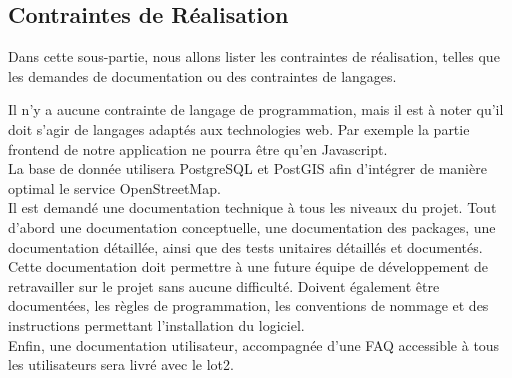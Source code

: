 \subsection{Contraintes de Réalisation}
Dans cette sous-partie, nous allons lister les contraintes de réalisation, telles que les demandes de documentation ou des contraintes de langages.

Il n'y a aucune contrainte de langage de programmation, mais il est à noter qu'il doit s'agir de langages adaptés aux technologies web. Par exemple la partie frontend de notre application ne pourra être qu'en Javascript.\\

La base de donnée utilisera PostgreSQL et PostGIS afin d'intégrer de manière optimal le service OpenStreetMap.\\

Il est demandé une documentation technique à tous les niveaux du projet. Tout d'abord une documentation conceptuelle, une documentation des packages, une documentation détaillée, ainsi que des tests unitaires détaillés et documentés. Cette documentation doit permettre à une future équipe de développement de retravailler sur le projet sans aucune difficulté. Doivent également être documentées, les règles de programmation, les conventions de nommage et des instructions permettant l'installation du logiciel.\\

Enfin, une documentation utilisateur, accompagnée d'une FAQ accessible à tous les utilisateurs sera livré avec le lot2.
